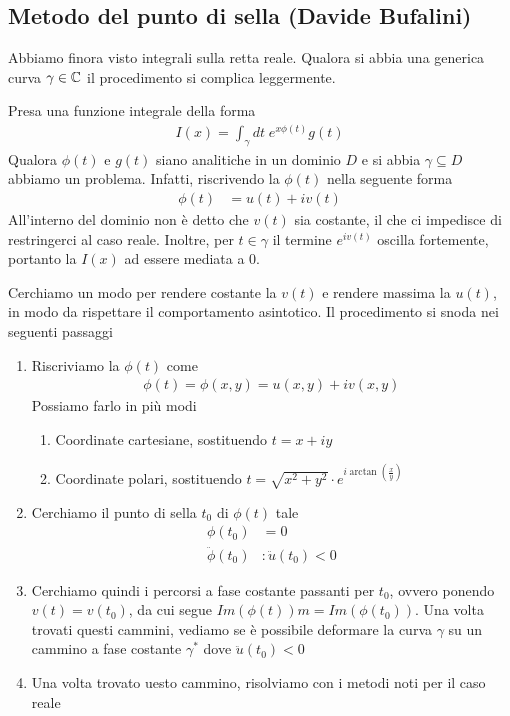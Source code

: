 \newpage

\subsection{Metodo del punto di sella (Davide Bufalini)}

Abbiamo finora visto integrali sulla retta reale. Qualora si abbia una generica curva $\gamma \in \mathbb{C}$ il procedimento si complica leggermente. 

Presa una funzione integrale della forma
\begin{align}
	I(x) = \int_\gamma dt \; e^{x\phi(t)} g(t)
\end{align}
Qualora $\phi(t)$ e $g(t)$ siano analitiche in un dominio $\mathit{D}$ e si abbia $\gamma \subseteq \mathit{D}$ abbiamo un problema. Infatti, riscrivendo la $\phi(t)$ nella seguente forma
\begin{align}
	\phi(t) &= u(t) + iv(t)
\end{align}
All'interno del dominio non è detto che $v(t)$ sia costante, il che ci impedisce di restringerci al caso reale. Inoltre, per $t \in \gamma$ il termine $e^{iv(t)}$ oscilla fortemente, portanto la $I(x)$ ad essere mediata a 0. 

Cerchiamo un modo per rendere costante la $v(t)$ e rendere massima la $u(t)$, in modo da rispettare il comportamento asintotico.
Il procedimento si snoda nei seguenti passaggi
\begin{enumerate}
	\item Riscriviamo la $\phi(t)$ come
	\begin{align}
		\phi(t) = \phi(x,y) = u(x,y) + iv(x,y)
	\end{align}
	Possiamo farlo in più modi
	\begin{enumerate}
		\item Coordinate cartesiane, sostituendo $t = x + iy$
		\item Coordinate polari, sostituendo $t = \sqrt{x^2 + y^2}\cdot e^{i \arctan \left(\frac{x}{y}\right)}$
	\end{enumerate}
	\item Cerchiamo il punto di sella $t_0$ di $\phi(t)$ tale
	\begin{align}
		\phi(t_0) &= 0 \\
		\ddot{\phi}(t_0) &: \ddot{u}(t_0) <0 
	\end{align}
	\item Cerchiamo quindi i percorsi a fase costante passanti per $t_0$, ovvero ponendo $v(t)= v(t_0)$, da cui segue $Im(\phi(t)) m= Im(\phi(t_0))$. Una volta trovati questi cammini, vediamo se è possibile deformare la curva $\gamma$ su un cammino a fase costante $\gamma^*$ dove $\ddot{u}(t_0) <0$  
	\item Una volta trovato uesto cammino, risolviamo con i metodi noti per il caso reale
	
\end{enumerate}

